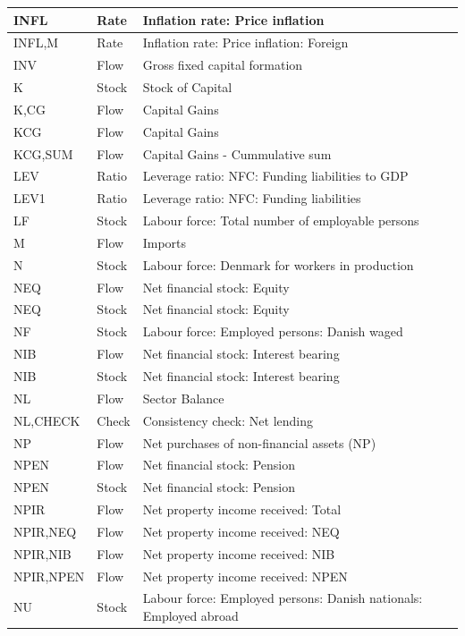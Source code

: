 \documentclass[
]{book}
\begin{document}
\begin{tabular}[t]{l|l|l}
\hline
INFL & Rate & Inflation rate: Price inflation\\
\hline
INFL,M & Rate & Inflation rate: Price inflation: Foreign\\
\hline
INV & Flow & Gross fixed capital formation\\
\hline
K & Stock & Stock of Capital\\
\hline
K,CG & Flow & Capital Gains\\
\hline
KCG & Flow & Capital Gains\\
\hline
KCG,SUM & Flow & Capital Gains - Cummulative sum\\
\hline
LEV & Ratio & Leverage ratio: NFC: Funding liabilities to GDP\\
\hline
LEV1 & Ratio & Leverage ratio: NFC: Funding liabilities\\
\hline
LF & Stock & Labour force: Total number of employable persons\\
\hline
M & Flow & Imports\\
\hline
N & Stock & Labour force: Denmark for workers in production\\
\hline
NEQ & Flow & Net financial stock: Equity\\
\hline
NEQ & Stock & Net financial stock: Equity\\
\hline
NF & Stock & Labour force: Employed persons: Danish waged\\
\hline
NIB & Flow & Net financial stock: Interest bearing\\
\hline
NIB & Stock & Net financial stock: Interest bearing\\
\hline
NL & Flow & Sector Balance\\
\hline
NL,CHECK & Check & Consistency check: Net lending\\
\hline
NP & Flow & Net purchases of non-financial assets (NP)\\
\hline
NPEN & Flow & Net financial stock: Pension\\
\hline
NPEN & Stock & Net financial stock: Pension\\
\hline
NPIR & Flow & Net property income received: Total\\
\hline
NPIR,NEQ & Flow & Net property income received: NEQ\\
\hline
NPIR,NIB & Flow & Net property income received: NIB\\
\hline
NPIR,NPEN & Flow & Net property income received: NPEN\\
\hline
NU & Stock & Labour force: Employed persons: Danish nationals: Employed abroad\\

\end{tabular}
\end{document}
